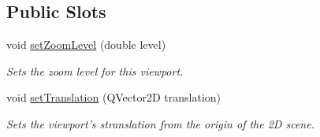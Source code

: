 \subsection*{Public Slots}
\begin{DoxyCompactItemize}
\item 
void \hyperlink{class_viewport2_d_a55a635e4b3cb2bb065060e95b266e55b}{set\-Zoom\-Level} (double level)
\begin{DoxyCompactList}\small\item\em Sets the zoom level for this viewport. \end{DoxyCompactList}\item 
void \hyperlink{class_viewport2_d_a992e40e2fabc27236ad34be272806d9b}{set\-Translation} (Q\-Vector2\-D translation)
\begin{DoxyCompactList}\small\item\em Sets the viewport's stranslation from the origin of the 2\-D scene. \end{DoxyCompactList}\end{DoxyCompactItemize}

